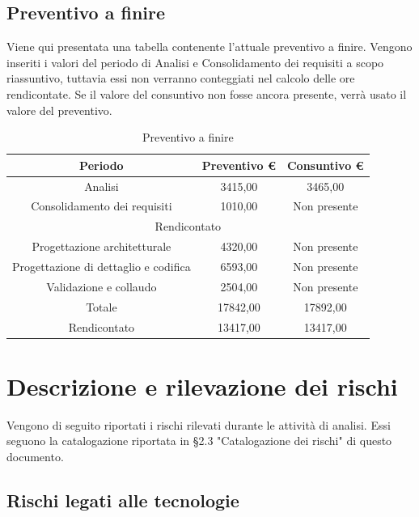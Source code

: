 \documentclass[./PianodiProgetto.tex]{subfiles}
\begin{document}
\section{Preventivo a finire}
Viene qui presentata una tabella contenente l'attuale preventivo a finire.
Vengono inseriti i valori del periodo di Analisi e Consolidamento dei requisiti
a scopo riassuntivo, tuttavia essi non verranno conteggiati nel calcolo delle
ore rendicontate. Se il valore del consuntivo non fosse ancora presente, verrà
usato il valore del preventivo.

\begin{table}[H]
	\centering
	\begin{tabular}{|c|c|c|}
		\hline
		Periodo&Preventivo \euro{}&Consuntivo \euro{} \\ \hline
		Analisi&3415,00&3465,00  \\ \hline
		Consolidamento dei requisiti&1010,00&Non presente  \\ \hline
		\multicolumn{3}{|c|}{Rendicontato}  \\ \hline
		Progettazione architetturale&4320,00&Non presente  \\ \hline
		Progettazione di dettaglio e codifica&6593,00&Non presente  \\ \hline
		Validazione e collaudo&2504,00&Non presente  \\ \hline
		Totale&17842,00&17892,00 \\ \hline
		Rendicontato&13417,00&13417,00 \\ \hline
	\end{tabular}
	\caption{Preventivo a finire}
\end{table}

\appendix


\appendix

\chapter{Descrizione e rilevazione dei rischi}

Vengono di seguito riportati i rischi rilevati durante le attività di analisi. Essi seguono la catalogazione riportata in §2.3 "Catalogazione dei rischi" di questo documento.

\section{Rischi legati alle tecnologie}
\end{document}
